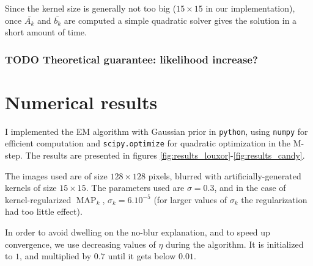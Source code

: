 \documentclass[english,a4paper]{article}
\theoremstyle{plain}
\theoremstyle{definition}
\theoremstyle{remark}
\DeclareMathOperator{\MAP}{MAP}
\begin{document}
Since the kernel size is generally not too big ($15\times 15$ in our implementation), once $\bar{A_k}$ and $\bar{b_k}$ are computed a simple quadratic solver gives the solution in a short amount of time.



\subsubsection{TODO Theoretical guarantee: likelihood increase?}


\section{Numerical results}
I implemented the EM algorithm with Gaussian prior in \texttt{python}, using \texttt{numpy} for efficient computation and \texttt{scipy.optimize} for quadratic optimization in the M-step.
The results are presented in figures \ref{fig:results_louxor}-\ref{fig:results_candy}.



The images used are of size $128\times 128$ pixels, blurred with artificially-generated kernels of size $15\times 15$. The parameters used are $\sigma = 0.3$, and in the case of kernel-regularized $\MAP_k$, $\sigma_k = 6.10^{-5}$ (for larger values of $\sigma_k$ the regularization had too little effect).

In order to avoid dwelling on the no-blur explanation, and to speed up convergence, we use decreasing values of $\eta$ during the algorithm. It is initialized to $1$, and multiplied by $0.7$ until it gets below $0.01$.
\end{document}
